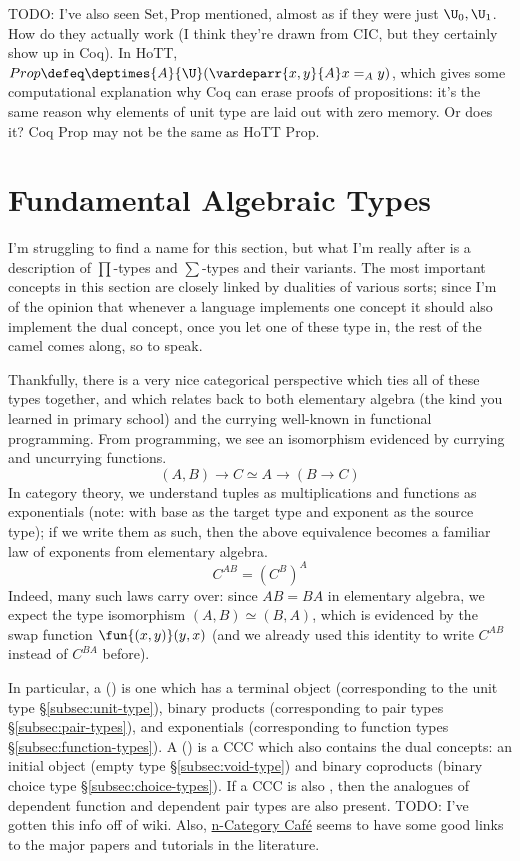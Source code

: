 \documentclass[11pt]{article} %
\theoremstyle{definition}
\theoremstyle{remark}
\begin{document}
TODO:
I've also seen $\mathrm{Set}, \mathrm{Prop}$ mentioned, almost as if they were just $\U_0, \U_1$.
How do they actually work (I think they're drawn from CIC, but they certainly show up in Coq).
In HoTT, $Prop \defeq \deptimes{A}{\U} (\vardeparr{x,y}{A}x =_A y)$, which gives some computational explanation why Coq can erase proofs of propositions: it's the same reason why elements of unit type are laid out with zero memory.
Or does it? Coq Prop may not be the same as HoTT Prop.


\section{Fundamental Algebraic Types}

I'm struggling to find a name for this section, but what I'm really after is a description of $\prod$-types and $\sum$-types and their variants.
The most important concepts in this section are closely linked by dualities of various sorts; since I'm of the opinion that whenever a language implements one concept it should also implement the dual concept, once you let one of these type in, the rest of the camel comes along, so to speak.

Thankfully, there is a very nice categorical perspective which ties all of these types together, and which relates back to both elementary algebra (the kind you learned in primary school) and the currying well-known in functional programming.
From programming, we see an isomorphism evidenced by currying and uncurrying functions.
  $$(A, B) \to C \simeq A \to (B \to C)$$
In category theory, we understand tuples as multiplications and functions as exponentials (note: with base as the target type and exponent as the source type); if we write them as such, then the above equivalence becomes a familiar law of exponents from elementary algebra.
  $$C^{AB} = (C^B)^A$$
Indeed, many such laws carry over: since $AB = BA$ in elementary algebra, we expect the type isomorphism $(A, B) \simeq (B, A)$, which is evidenced by the swap function $\fun{(x, y)}(y,x)$ (and we already used this identity to write $C^{AB}$ instead of $C^{BA}$ before).

In particular, a  () is one which has a terminal object (corresponding to the unit type \S\ref{subsec:unit-type}), binary products (corresponding to pair types \S\ref{subsec:pair-types}), and exponentials (corresponding to function types \S\ref{subsec:function-types}).
A  () is a CCC which also contains the dual concepts: an initial object (empty type \S\ref{subsec:void-type}) and binary coproducts (binary choice type \S\ref{subsec:choice-types}).
If a CCC is also , then the analogues of dependent function and dependent pair types are also present.
TODO: I've gotten this info off of wiki.
Also, \href{https://golem.ph.utexas.edu/category/2006/08/cartesian_closed_categories_an_1.html}{n-Category Caf\'e} seems to have some good links to the major papers and tutorials in the literature.
\end{document}
